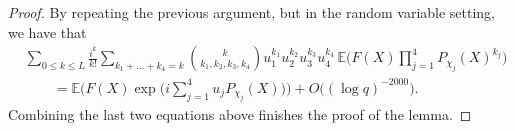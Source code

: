 \documentclass[10pt,a4paper]{amsart}
\newcommand{\E}{\mathbb{E}}
\begin{document}
\begin{proof}
By repeating the previous argument, but in the random variable setting, we have that
\begin{align*}
 & \sum_{0 \leq k \leq L} \frac{i^k}{k!} \sum_{k_1+\ldots +k_4=k} {k \choose k_1,k_2,k_3,k_4} u_1^{k_1} u_2^{k_2} u_3^{k_3} u_4^{k_4} \, \E\bigg(  F(X) \prod_{j=1}^4 P_{\chi_j}(X)^{k_j}\bigg)\\
  &\qquad= \E \Bigg( F(X) \exp\bigg(  i\sum_{j=1}^4 u_jP_{\chi_j}(X)\bigg) \Bigg) + O \big((\log q)^{-2000}\big).
\end{align*}
Combining the last two equations above finishes the proof of the lemma.
\end{proof}
\end{document}
